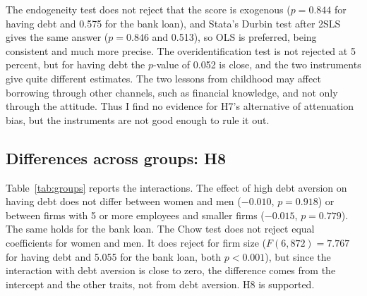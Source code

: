 \documentclass[preprint,letterpaper,11pt,authoryear]{elsarticle}
\begin{document}
The endogeneity test does not reject that the score is exogenous ($p = 0.844$ for having debt and 0.575 for the bank loan), and Stata's Durbin test after 2SLS gives the same answer ($p = 0.846$ and 0.513), so OLS is preferred, being consistent and much more precise. The overidentification test is not rejected at 5 percent, but for having debt the $p$-value of 0.052 is close, and the two instruments give quite different estimates. The two lessons from childhood may affect borrowing through other channels, such as financial knowledge, and not only through the attitude. Thus I find no evidence for H7's alternative of attenuation bias, but the instruments are not good enough to rule it out.

\subsection{Differences across groups: H8}

Table~\ref{tab:groups} reports the interactions. The effect of high debt aversion on having debt does not differ between women and men ($-0.010$, $p = 0.918$) or between firms with 5 or more employees and smaller firms ($-0.015$, $p = 0.779$). The same holds for the bank loan. The Chow test does not reject equal coefficients for women and men. It does reject for firm size ($F(6, 872) = 7.767$ for having debt and 5.055 for the bank loan, both $p < 0.001$), but since the interaction with debt aversion is close to zero, the difference comes from the intercept and the other traits, not from debt aversion. H8 is supported.
\end{document}
